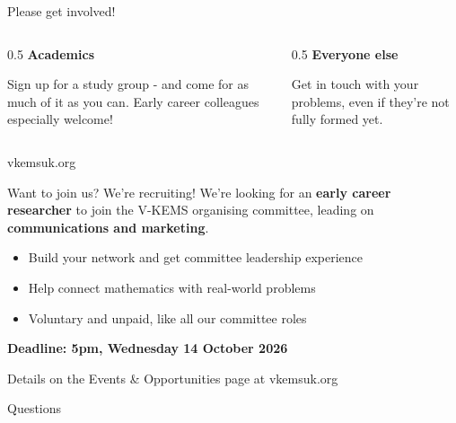 \documentclass[aspectratio=169,11pt]{beamer}
\begin{document}
\begin{frame}{Please get involved!}
  \begin{columns}[T]
    \begin{column}{0.5\textwidth}
      \textbf{Academics}

      \vspace{0.8em}
      Sign up for a study group - and come for as much of it as you can. Early career colleagues especially welcome!
    \end{column}
    \begin{column}{0.5\textwidth}
      \textbf{Everyone else}

      \vspace{0.8em}
      Get in touch with your problems, even if they're not fully formed yet.
    \end{column}
  \end{columns}
  \vfill
  \begin{center}
    \Large \alert{vkemsuk.org}
  \end{center}
\end{frame}

\begin{frame}{Want to join us? We're recruiting!}
  We're looking for an \textbf{early career researcher} to join the V-KEMS
  organising committee, leading on \textbf{communications and marketing}.

  \vspace{0.8em}
  \begin{itemize}
    \item Build your network and get committee leadership experience
    \item Help connect mathematics with real-world problems
    \item Voluntary and unpaid, like all our committee roles
  \end{itemize}
  \vfill
  \textbf{Deadline: 5pm, Wednesday 14 October 2026}

  Details on the Events \& Opportunities page at vkemsuk.org
\end{frame}

\begin{frame}[standout]
  Questions
\end{frame}
\end{document}
